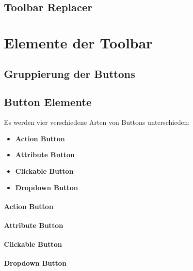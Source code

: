 \subsection{Toolbar Replacer}

\section{Elemente der Toolbar}
\subsection{Gruppierung der Buttons}

\subsection{Button Elemente}
\label{subsec:buttons}
Es werden vier verschiedene Arten von Buttons unterschieden: 

\begin{itemize}
	\item{\textbf{Action Button}}
	\item{\textbf{Attribute Button}}
	\item{\textbf{Clickable Button}}
	\item{\textbf{Dropdown Button}}
\end{itemize}

\paragraph{Action Button}

\paragraph{Attribute Button}

\paragraph{Clickable Button}

\paragraph{Dropdown Button}
\label{dropdown_button}
